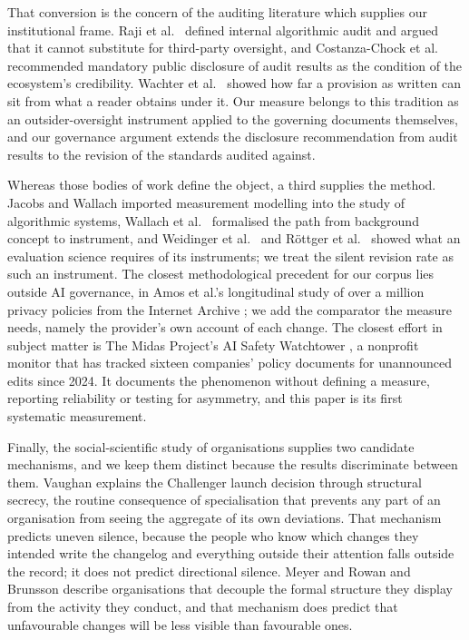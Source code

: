 \documentclass{article}
\begin{document}
That conversion is the concern of the auditing literature which supplies our institutional frame. Raji et al.\ \citep{raji2020closing,raji2022outsider} defined internal algorithmic audit and argued that it cannot substitute for third-party oversight, and Costanza-Chock et al.\ \citep{costanzachock2022who} recommended mandatory public disclosure of audit results as the condition of the ecosystem's credibility. Wachter et al.\ \citep{wachter2017why} showed how far a provision as written can sit from what a reader obtains under it. Our measure belongs to this tradition as an outsider-oversight instrument applied to the governing documents themselves, and our governance argument extends the disclosure recommendation from audit results to the revision of the standards audited against.

Whereas those bodies of work define the object, a third supplies the method. Jacobs and Wallach \citep{jacobs2021measurement} imported measurement modelling into the study of algorithmic systems, Wallach et al.\ \citep{wallach2025position} formalised the path from background concept to instrument, and Weidinger et al.\ \citep{weidinger2025toward} and R\"ottger et al.\ \citep{rottger2025safetyprompts,rottger2024political} showed what an evaluation science requires of its instruments; we treat the silent revision rate as such an instrument. The closest methodological precedent for our corpus lies outside AI governance, in Amos et al.'s longitudinal study of over a million privacy policies from the Internet Archive \citep{amos2021privacy}; we add the comparator the measure needs, namely the provider's own account of each change. The closest effort in subject matter is The Midas Project's AI Safety Watchtower \citep{midas2024watchtower}, a nonprofit monitor that has tracked sixteen companies' policy documents for unannounced edits since 2024. It documents the phenomenon without defining a measure, reporting reliability or testing for asymmetry, and this paper is its first systematic measurement.

Finally, the social-scientific study of organisations supplies two candidate mechanisms, and we keep them distinct because the results discriminate between them. Vaughan \citep{vaughan1996challenger} explains the Challenger launch decision through structural secrecy, the routine consequence of specialisation that prevents any part of an organisation from seeing the aggregate of its own deviations. That mechanism predicts uneven silence, because the people who know which changes they intended write the changelog and everything outside their attention falls outside the record; it does not predict directional silence. Meyer and Rowan \citep{meyer1977institutionalized} and Brunsson \citep{brunsson1989organization} describe organisations that decouple the formal structure they display from the activity they conduct, and that mechanism does predict that unfavourable changes will be less visible than favourable ones.
\end{document}
